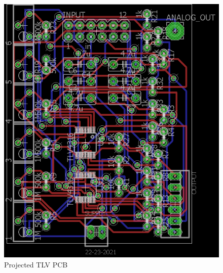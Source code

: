 \begin{figure}[!htpb]
\centering
\caption{Projected TLV PCB}
\label{TLV_PCB}
\includegraphics[scale=1.8]{images/tlv_b}
\end{figure}

